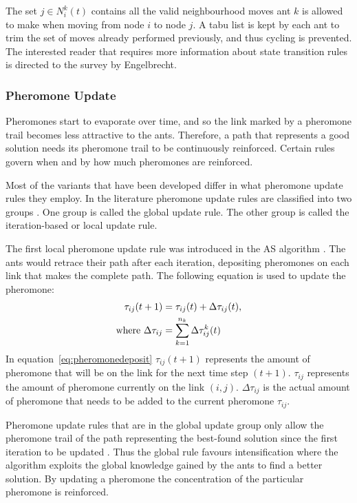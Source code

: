 The set $j \in N^k_i(t)$ contains all the valid neighbourhood moves ant $k$ is allowed to make when moving from node $i$ to node $j$. A tabu list is kept by each ant to trim the set of moves already performed previously, and thus cycling is prevented. The interested reader that requires more information about state transition rules is directed to the survey by Engelbrecht\cite{FundamentalSwarm}.
\subsubsection{Pheromone Update}
Pheromones start to evaporate over time, and so the link marked by a pheromone trail becomes less attractive to the ants. Therefore, a path that represents a good solution needs its pheromone trail to be continuously reinforced. Certain rules govern when and by how much pheromones are reinforced.

 Most of the variants that have been developed differ in what pheromone update rules they employ. In the literature pheromone update rules are classified into two groups \cite{CompuIntelligenceIntro}. One group is called the global update rule. The other group is called the iteration-based or local update rule\cite{CompuIntelligenceIntro}. 

The first local pheromone update rule was introduced in the \gls{AS} algorithm \cite{CompuIntelligenceIntro,ACOSurvey,AntsAndStigmergy}. The ants would retrace their path after each iteration, depositing pheromones on each link that makes the complete path. The following equation is used to update the pheromone:
\begin{align}
\label{eq:pheromonedeposit}
 \tau_{ij}(t+1) &= \tau_{ij}(t) + \Delta\tau_{ij}(t),\\ 
 \text{where }\Delta\tau_{ij} &= \sum^{n_k}_{k=1}\Delta\tau^k_{ij}(t) \notag
\end{align}
In equation~\ref{eq:pheromonedeposit} $\tau_{ij}(t+1)$ represents the amount of pheromone that will be on the link for the next time step $(t+1)$. $\tau_{ij}$ represents the amount of pheromone currently on the link $(i,j)$. $\Delta\tau_{ij}$ is the actual amount of pheromone that needs to be added to the current pheromone $\tau_{ij}$.

Pheromone update rules that are in the global update group only allow the pheromone trail of the path representing the best-found solution since the first iteration to be updated \cite{CompuIntelligenceIntro}. Thus the global rule favours intensification where the algorithm exploits the global knowledge gained by the ants to find a better solution. By updating a pheromone the concentration of the particular pheromone is reinforced.

